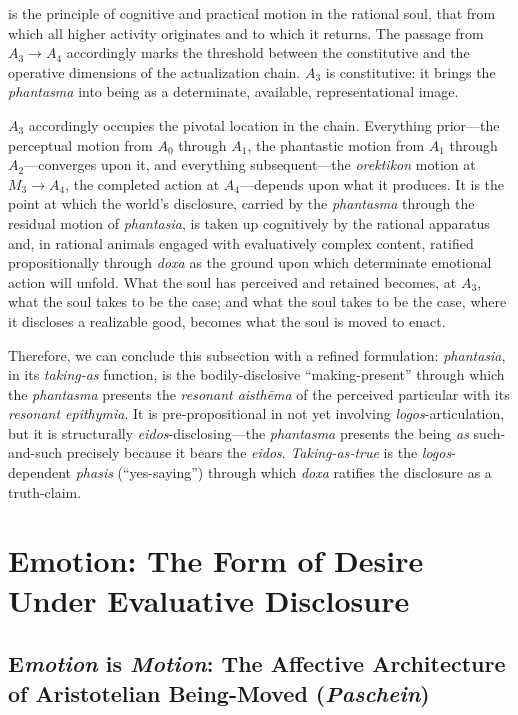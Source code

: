 is the principle of cognitive and practical motion in the rational soul, that from which all higher activity originates and to which it returns. The passage from $A_3 \to A_4$ accordingly marks the threshold between the constitutive and the operative dimensions of the actualization chain. $A_3$ is constitutive: it brings the \textit{phantasma} into being as a determinate, available, representational image. 

$A_3$ accordingly occupies the pivotal location in the chain. Everything prior---the perceptual motion from $A_0$ through $A_1$, the phantastic motion from $A_1$ through $A_2$---converges upon it, and everything subsequent---the \textit{orektikon} motion at $M_3 \rightarrow A_4$, the completed action at $A_4$---depends upon what it produces. It is the point at which the world's disclosure, carried by the \textit{phantasma} through the residual motion of \textit{phantasia}, is taken up cognitively by the rational apparatus and, in rational animals engaged with evaluatively complex content, ratified propositionally through \textit{doxa} as the ground upon which determinate emotional action will unfold. What the soul has perceived and retained becomes, at $A_3$, what the soul takes to be the case; and what the soul takes to be the case, where it discloses a realizable good, becomes what the soul is moved to enact.

Therefore, we can conclude this subsection with a refined formulation: \textit{phantasia}, in its \textit{taking-as} function, is the bodily-disclosive ``making-present'' through which the \textit{phantasma} presents the \textit{resonant aisthēma} of the perceived particular with its \textit{resonant epithymia}. It is pre-propositional in not yet involving \textit{logos}-articulation, but it is structurally \textit{eidos}-disclosing---the \textit{phantasma} presents the being \textit{as} such-and-such precisely because it bears the \textit{eidos}. \textit{Taking-as-true} is the \textit{logos}-dependent \textit{phasis} (``yes-saying'') through which \textit{doxa} ratifies the disclosure as a truth-claim. 






\section{Emotion: The Form of Desire Under Evaluative Disclosure}


\subsection{E\textit{motion} is \textit{Motion}: The Affective Architecture of Aristotelian Being-Moved (\textit{Paschein})}

